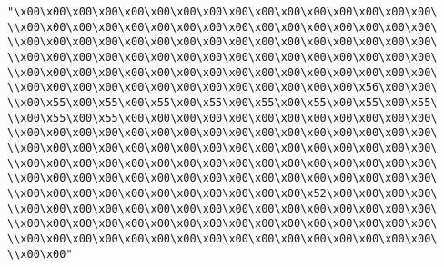 \verb|"\x00\x00\x00\x00\x00\x00\x00\x00\x00\x00\x00\x00\x00\x00\x00\x00\|\newline
\verb|\\x00\x00\x00\x00\x00\x00\x00\x00\x00\x00\x00\x00\x00\x00\x00\x00\|\newline
\verb|\\x00\x00\x00\x00\x00\x00\x00\x00\x00\x00\x00\x00\x00\x00\x00\x00\|\newline
\verb|\\x00\x00\x00\x00\x00\x00\x00\x00\x00\x00\x00\x00\x00\x00\x00\x00\|\newline
\verb|\\x00\x00\x00\x00\x00\x00\x00\x00\x00\x00\x00\x00\x00\x00\x00\x00\|\newline
\verb|\\x00\x00\x00\x00\x00\x00\x00\x00\x00\x00\x00\x00\x00\x56\x00\x00\|\newline
\verb|\\x00\x55\x00\x55\x00\x55\x00\x55\x00\x55\x00\x55\x00\x55\x00\x55\|\newline
\verb|\\x00\x55\x00\x55\x00\x00\x00\x00\x00\x00\x00\x00\x00\x00\x00\x00\|\newline
\verb|\\x00\x00\x00\x00\x00\x00\x00\x00\x00\x00\x00\x00\x00\x00\x00\x00\|\newline
\verb|\\x00\x00\x00\x00\x00\x00\x00\x00\x00\x00\x00\x00\x00\x00\x00\x00\|\newline
\verb|\\x00\x00\x00\x00\x00\x00\x00\x00\x00\x00\x00\x00\x00\x00\x00\x00\|\newline
\verb|\\x00\x00\x00\x00\x00\x00\x00\x00\x00\x00\x00\x00\x00\x00\x00\x00\|\newline
\verb|\\x00\x00\x00\x00\x00\x00\x00\x00\x00\x00\x00\x52\x00\x00\x00\x00\|\newline
\verb|\\x00\x00\x00\x00\x00\x00\x00\x00\x00\x00\x00\x00\x00\x00\x00\x00\|\newline
\verb|\\x00\x00\x00\x00\x00\x00\x00\x00\x00\x00\x00\x00\x00\x00\x00\x00\|\newline
\verb|\\x00\x00\x00\x00\x00\x00\x00\x00\x00\x00\x00\x00\x00\x00\x00\x00\|\newline
\verb|\\x00\x00"|\newline
